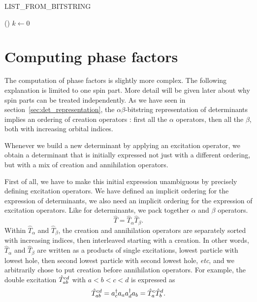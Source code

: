 \documentclass[./thesis.tex]{subfiles}
\begin{document}
\begin{algorithm}[h!]
	\caption{LIST\_FROM\_BITSTRING}
	\label{alg:LIST_FROM_BITSTRING}
	
	\Fn(){}{
		$k \gets 0$ \;
		}
		
\end{algorithm}



\section{Computing phase factors}


The computation of phase factors is slightly more complex. The following explanation is limited to one spin part. More detail will be given later about why spin parts can be treated independently.
As we have seen in section~\ref{sec:det_representation}, the $\alpha \beta$-bitstring representation of determinants implies an ordering of creation operators : first all the $\alpha$ operators, then all the $\beta$, both with increasing orbital indices.

Whenever we build a new determinant by applying an excitation operator, we obtain a determinant that is initially expressed not just with a different ordering, but with a mix of creation and annihilation operators.

First of all, we have to make this initial expression unambiguous by precisely defining excitation operators. We have defined an implicit ordering for the expression of determinants, we also need an implicit ordering for the expression of excitation operators.
Like for determinants, we pack together $\alpha$ and $\beta$ operators.
\begin{equation}
\label{eq:spinpackexc}
\hat T = \hat T_\alpha \hat T_\beta.
\end{equation}
Within $\hat T_\alpha$ and $\hat T_\beta$, the creation and annihilation operators are separately sorted with increasing indices, then interleaved starting with a creation. In other words, $\hat T_\alpha$ and $\hat T_\beta$ are written as a products of single excitations, lowest particle with lowest hole, then second lowest particle with second lowest hole, \textit{etc}, and we arbitrarily chose to put creation before annihilation operators.
For example, the double excitation ${\hat{T}_{ab}^{cd}}$ with $a<b<c<d$ is expressed as
\begin{equation}
\hat T_{ab}^{cd} = a^\dagger_{c} a_{a} a^\dagger_{d} a_{b} = \hat T_a^c \hat T_b^d.
\end{equation}
\end{document}
